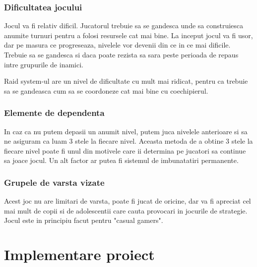 \documentclass[12pt, a4paper]{article}
\begin{document}
	
	
	
	
	\subsubsection{Dificultatea jocului}
	
	Jocul va fi relativ dificil. Jucatorul trebuie sa se gandesca unde sa construiesca anumite turnuri pentru a folosi resursele cat mai bine. La inceput jocul va fi usor, dar pe masura ce progreseaza, nivelele vor devenii din ce in ce mai dificile. Trebuie sa se gandesca si daca poate rezista sa sara peste perioada de repaus intre grupurile de inamici.
	\newline
	
	Raid system-ul are un nivel de dificultate cu mult mai ridicat, pentru ca trebuie sa se gandeasca cum sa se coordoneze cat mai bine cu coechipierul.
	
	
	
	
	
	\subsubsection{Elemente de dependenta}
	
	In caz ca nu putem depasii un anumit nivel, putem juca nivelele anterioare si sa ne asiguram ca luam 3 stele la fiecare nivel. Aceasta metoda de a obtine 3 stele la fiecare nivel poate fi unul din motivele care ii determina pe jucatori sa continue sa joace jocul. Un alt factor ar putea fi sistemul de imbunatatiri permanente.
	
	
	
	
	
	\subsubsection{Grupele de varsta vizate}
	
	Acest joc nu are limitari de varsta, poate fi jucat de oricine, dar va fi apreciat cel mai mult de copii si de adolescentii care cauta provocari in jocurile de strategie. Jocul este in principiu facut pentru "casual gamers".
	
	
	
	
	
	\section{Implementare proiect}
	\label{section: projectImplementation}
	
\end{document}
